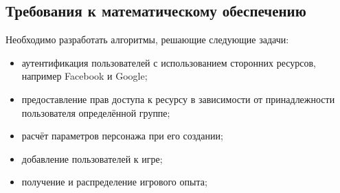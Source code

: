 \subsection{Требования к математическому обеспечению}

Необходимо разработать алгоритмы, решающие следующие задачи:

\begin{itemize}
\item аутентификация пользователей с использованием сторонних ресурсов, например Facebook и Google;
\item предоставление прав доступа к ресурсу в зависимости от принадлежности пользователя определённой группе;
\item расчёт параметров персонажа при его создании;
\item добавление пользователей к игре;
\item получение и распределение игрового опыта;
\end{itemize}
